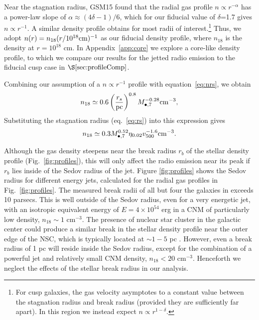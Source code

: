 \documentclass[usenatbib,fleqn]{mnras}
\newcommand{\Mbh}[1][]{M_{\bullet#1}}
\begin{document}
Near the stagnation radius, GSM15 found that the radial gas profile $n \propto r^{-\alpha}$ has a power-law slope of $\alpha \approx (4\delta-1)/6$, which for our fiducial value of $\delta$=1.7 gives $n \propto r^{-1}$.  A similar density profile obtains for most radii of interest.\footnote{For cusp galaxies, the gas velocity asymptotes to a constant value between the stagnation radius and break radius (provided they are
  sufficiently far apart). In this region we instead expect $n\propto r^{1-\delta}$.}  Thus, we adopt $n(r)= n_{18} (r/10^{18} {\rm cm})^{-1}$ as our fiducial density profile, where $n_{18}$ is the density at $r = 10^{18}$ cm.  In Appendix~\ref{app:core} we explore a core-like density profile, to which we compare our results for the jetted radio emission to the fiducial cusp case in $\S\ref{sec:profileComp}$.

Combining our assumption of a $n\propto r^{-1}$ profile with equation~\eqref{eq:nrs}, we
obtain
\begin{equation}
  n_{18}\simeq 0.6 \left(\frac{r_s}{\rm pc}\right)^{0.8}
  \Mbh[,7]^{-0.28} {\rm cm^{-3}},
  \label{eq:n18}
\end{equation}
Substituting the stagnation radius (eq.~\ref{eq:rs}) into this expression gives
\begin{equation}
n_{18}\simeq 0.3 \Mbh[,7]^{0.52} \eta_{0.02} v_{500}^{-1.6} {\rm
  cm^{-3}}.
\label{eq:n182}
\end{equation} 

Although the gas density steepens near the break radius $r_b$ of the stellar density profile (Fig.~\ref{fig:profiles}), this will only affect the radio emission near its peak if $r_b$ lies inside of the Sedov radius of the jet.  Figure \ref{fig:profiles} shows the Sedov radius for different energy jets, calculated for the radial gas profiles in Fig.~\ref{fig:profiles}.  The measured break radii of all but four the galaxies in \citet{Lauer+2007} exceeds 10 parsecs.  This is well outside of the Sedov radius, even for a very energetic jet, with an isotropic equivalent energy of $E=4\times 10^{54}$ erg in a CNM of particularly low density, $n_{18} \sim 1$ cm$^{-3}$.  The presence of nuclear star cluster in the galactic center could produce a similar break in the stellar density profile near the outer edge of the NSC, which is typically located at $\sim 1-5$ pc \citep{Georgiev+2014}.   However, even a break radius of 1 pc will reside inside the Sedov radius, except for  the combination of a powerful jet and relatively small CNM density, $n_{18}<20$ cm$^{-3}$.  Henceforth we neglect the effects of the stellar break radius in our analysis.
\end{document}
